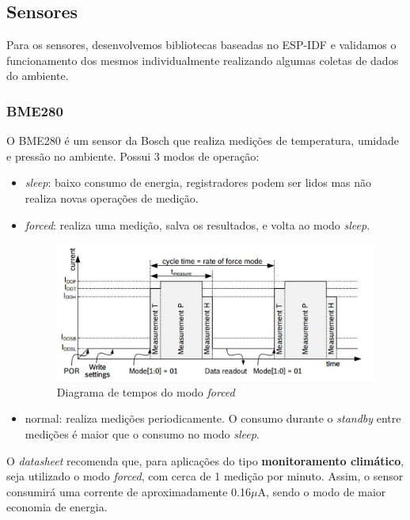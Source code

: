 \documentclass[../monografia.tex]{subfiles}
\begin{document}
\subsection{Sensores}

Para os sensores, desenvolvemos bibliotecas baseadas no ESP-IDF e validamos o funcionamento dos mesmos individualmente realizando algumas coletas de dados do ambiente. 

\subsubsection{BME280}

O BME280 é um sensor da Bosch que realiza medições de temperatura, umidade e pressão no ambiente. Possui 3 modos de operação: \cite{bme280}
\begin{itemize}
	\item \textit{sleep}: baixo consumo de energia, registradores podem ser lidos mas não realiza novas operações de medição.
	\item \textit{forced}: realiza uma medição, salva os resultados, e volta ao modo \textit{sleep}.
	
	\begin{figure}[h]
		\centering
		\includegraphics[width=12cm]{timing_bme280}
		\caption{Diagrama de tempos do modo \textit{forced}}
		\label{fig:time_bme280}
	\end{figure}

	\item normal: realiza medições periodicamente. O consumo durante o \textit{standby} entre medições é maior que o consumo no modo \textit{sleep}. 
\end{itemize}

O \textit{datasheet} recomenda que, para aplicações do tipo \textbf{monitoramento climático}, seja utilizado o modo \textit{forced}, com cerca de 1 medição por minuto. Assim, o sensor consumirá uma corrente de aproximadamente 0.16$\mu$A, sendo o modo de maior economia de energia. 
\end{document}
